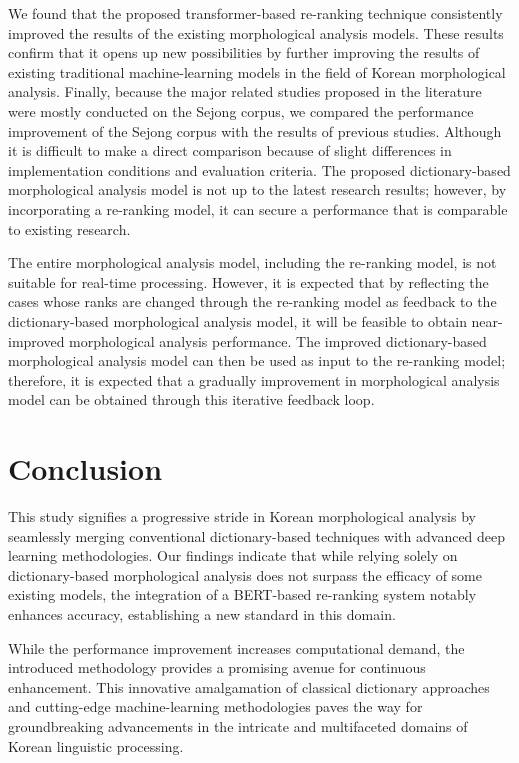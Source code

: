 \documentclass[AMS,STIX2COL]{WileyNJD-v2}
\begin{document}
    We found that the proposed transformer-based re-ranking technique consistently improved the results of the existing morphological analysis models. These results confirm that it opens up new possibilities by further improving the results of existing traditional machine-learning models in the field of Korean morphological analysis. Finally, because the major related studies proposed in the literature were mostly conducted on the Sejong corpus, we compared the performance improvement of the Sejong corpus with the results of previous studies. Although it is difficult to make a direct comparison because of slight differences in implementation conditions and evaluation criteria. The proposed dictionary-based morphological analysis model is not up to the latest research results; however, by incorporating a re-ranking model, it can secure a performance that is comparable to existing research.

    The entire morphological analysis model, including the re-ranking model, is not suitable for real-time processing. However, it is expected that by reflecting the cases whose ranks are changed through the re-ranking model as feedback to the dictionary-based morphological analysis model, it will be feasible to obtain near-improved morphological analysis performance. The improved dictionary-based morphological analysis model can then be used as input to the re-ranking model; therefore, it is expected that a gradually improvement in morphological analysis model can be obtained through this iterative feedback loop.


    \section{Conclusion}\label{sec:conclusion}

    This study signifies a progressive stride in Korean morphological analysis by seamlessly merging conventional dictionary-based techniques with advanced deep learning methodologies. Our findings indicate that while relying solely on dictionary-based morphological analysis does not surpass the efficacy of some existing models, the integration of a BERT-based re-ranking system notably enhances accuracy, establishing a new standard in this domain.

    While the performance improvement increases computational demand, the introduced methodology provides a promising avenue for continuous enhancement. This innovative amalgamation of classical dictionary approaches and cutting-edge machine-learning methodologies paves the way for groundbreaking advancements in the intricate and multifaceted domains of Korean linguistic processing.
\end{document}
